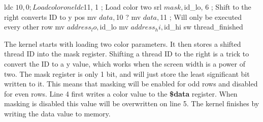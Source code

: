 \documentclass[../main/report.tex]{subfiles}
\begin{document}
\begin{assembly}[caption=Conditional execution using predicated instructions, label=lst:masked-execution]
ldc $10, 0 ; Load color one
ldc $11, 1 ; Load color two
srl $mask, $id_lo, 6 ; Shift to the right converts ID to y pos
mv $data, $10 
? mv $data, $11 ; Will only be executed every other row
mv $address_lo, $id_lo
mv $address_hi, $id_hi
sw
thread_finished
\end{assembly}

The kernel starts with loading two color parameters.
It then stores a shifted thread ID into the mask register.
Shifting a thread ID to the right is a trick to convert the ID to a y value,
which works when the screen width is a power of two.
The mask register is only 1 bit, and will just store the least significant bit written to it.
This means that masking will be enabled for odd rows and disabled for even rows.
Line 4 first writes a color value to the \textbf{\$data} register.
When masking is disabled this value will be overwritten on line 5.
The kernel finishes by writing the data value to memory.

\end{document}
